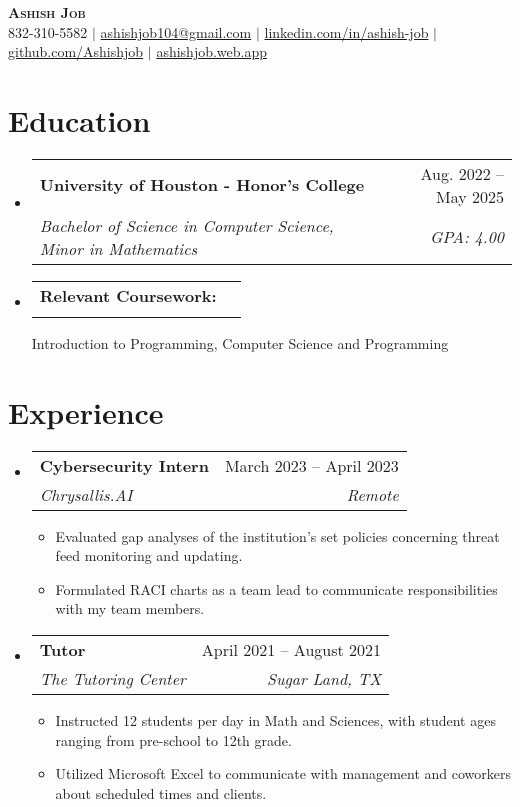 \documentclass[letterpaper,11pt]{article}
\makeatletter
\newcommand{\resumeItem}[1]{
  \item\small{
    {#1 \vspace{-2pt}}
  }
}
\newcommand{\resumeSubheading}[4]{
  \vspace{-2pt}\item
    \begin{tabular*}{0.97\textwidth}[t]{l@{\extracolsep{\fill}}r}
      \textbf{#1} & #2 \\
      \textit{\small#3} & \textit{\small #4} \\
    \end{tabular*}\vspace{-7pt}
}
\newcommand{\resumeSubHeadingListStart}{\begin{itemize}[leftmargin=0.15in, label={}]}
\newcommand{\resumeSubHeadingListEnd}{\end{itemize}}
\newcommand{\resumeItemListStart}{\begin{itemize}}
\newcommand{\resumeItemListEnd}{\end{itemize}\vspace{-5pt}}
\makeatother
\begin{document}

\begin{center}
    \textbf{\Huge \scshape Ashish Job} \\ \vspace{1pt}
    \small {832-310-5582} $|$ \href{mailto:ashishjob104@gmail.com}{{ashishjob104@gmail.com}} $|$ 
    \href{https://linkedin.com/in/ashish-job/}{{linkedin.com/in/ashish-job}} 
    $|$ \href{https://github.com/Ashishjob}{{github.com/Ashishjob}}
    $|$ \href{https://ashishjob.web.app/}{{ashishjob.web.app}}
    
\end{center}


\section{Education}
  \resumeSubHeadingListStart
    \resumeSubheading
      {University of Houston - Honor's College}{Aug. 2022 -- May 2025}
      {Bachelor of Science in Computer Science, Minor in Mathematics}{GPA: 4.00}
    \resumeSubheading{Relevant Coursework:}{}{}{}{Introduction to Programming,}{ Computer Science and Programming}
  \resumeSubHeadingListEnd


\section{Experience}
  \resumeSubHeadingListStart
  
    \resumeSubheading
      {Cybersecurity Intern}{March 2023 -- April 2023}
      {Chrysallis.AI}{Remote}
      \resumeItemListStart
        \resumeItem{Evaluated gap analyses of the institution's set policies concerning threat feed monitoring and updating.}
        \resumeItem{Formulated RACI charts as a team lead to communicate responsibilities with my team members.}
      \resumeItemListEnd
      
    \resumeSubheading
      {Tutor}{April 2021 -- August 2021}
      {The Tutoring Center}{Sugar Land, TX}
      \resumeItemListStart
        \resumeItem{Instructed 12 students per day in Math and Sciences, with student ages ranging from pre-school to 12th grade.}
        \resumeItem{Utilized Microsoft Excel to communicate with management and coworkers about scheduled times and clients.}
      \resumeItemListEnd
    \resumeSubHeadingListEnd
      
\end{document}

